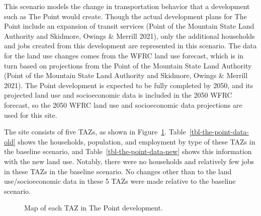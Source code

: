 \documentclass[fancy, twoside, mastersfancy, ms]{byuthesis}
\begin{document}
This scenario models the change in transportation behavior that a
development such as The Point would create. Though the actual
development plans for The Point include an expansion of transit services
(Point of the Mountain State Land Authority and Skidmore, Owings \&
Merrill 2021), only the additional households and jobs created from this
development are represented in this scenario. The data for the land use
changes comes from the WFRC land use forecast, which is in turn based on
projections from the Point of the Mountain State Land Authority (Point
of the Mountain State Land Authority and Skidmore, Owings \& Merrill
2021). The Point development is expected to be fully completed by 2050,
and its projected land use and socioeconomic data is included in the
2050 WFRC forecast, so the 2050 WFRC land use and socioeconomic data
projections are used for this site.

The site consists of five TAZs, as shown in
Figure~\ref{fig-the-point-zones}. Table~\ref{tbl-the-point-data-old}
shows the households, population, and employment by type of these TAZs
in the baseline scenario, and Table~\ref{tbl-the-point-data-new} shows
this information with the new land use. Notably, there were no
households and relatively few jobs in these TAZs in the baseline
scenario. No changes other than to the land use/socioeconomic data in
these 5 TAZs were made relative to the baseline scenario.

\begin{figure}


\caption{\label{fig-the-point-zones}Map of each TAZ in The Point
development.}

\end{figure}%

\begin{table}

\caption{\label{tbl-the-point-data-old}TAZ-level Socioeconomic Data for
The Point (Baseline Scenario)}


\end{table}%
\end{document}
